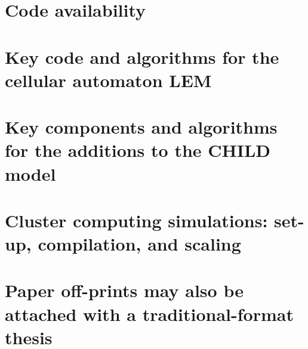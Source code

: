 \chapter{Code availability}

\chapter{Key code and algorithms for the cellular automaton LEM}

\chapter{Key components and algorithms for the additions to the CHILD model}



\chapter{Cluster computing simulations: set-up, compilation, and scaling}

\chapter{Paper off-prints may also be attached with a traditional-format thesis}